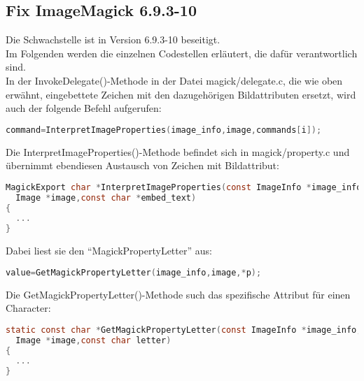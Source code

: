 \subsection{Fix ImageMagick 6.9.3-10}\label{subsec:fix-imagemagick-6.9.3-10}

Die Schwachstelle ist in Version 6.9.3-10 beseitigt.\\
Im Folgenden werden die einzelnen Codestellen erläutert, die dafür verantwortlich sind.\\

In der InvokeDelegate()-Methode in der Datei magick/delegate.c, die wie oben erwähnt, eingebettete Zeichen mit den dazugehörigen Bildattributen ersetzt, wird auch der folgende Befehl aufgerufen:\\

\begin{lstlisting}[firstnumber=1295, language=C, caption=magick/delegate.c Aufruf InterpretImageProperties(),label={lst:lstlisting}]
command=InterpretImageProperties(image_info,image,commands[i]);
\end{lstlisting}
\vspace{5mm}

Die InterpretImageProperties()-Methode befindet sich in magick/property.c und übernimmt ebendiesen Austausch von Zeichen mit Bildattribut:\\

\begin{lstlisting}[firstnumber=3347, language=C, caption=magick/property.c InterpretImageProperties(),label={lst:lstlisting}]
MagickExport char *InterpretImageProperties(const ImageInfo *image_info,
  Image *image,const char *embed_text)
{
  ...
}
\end{lstlisting}
\vspace{5mm}

Dabei liest sie den "`MagickPropertyLetter"' aus:\\

\begin{lstlisting}[firstnumber=3466, language=C, caption=magick/property.c Aufruf GetMagickPropertyLetter(),label={lst:lstlisting}]
  value=GetMagickPropertyLetter(image_info,image,*p);
\end{lstlisting}
\vspace{5mm}

Die GetMagickPropertyLetter()-Methode such das spezifische Attribut für einen Character:\\

\begin{lstlisting}[firstnumber=2343, language=C, caption=magick/property.c GetMagickPropertyLetter(),label={lst:lstlisting}]
static const char *GetMagickPropertyLetter(const ImageInfo *image_info,
  Image *image,const char letter)
{
  ...
}
\end{lstlisting}
\vspace{5mm}

